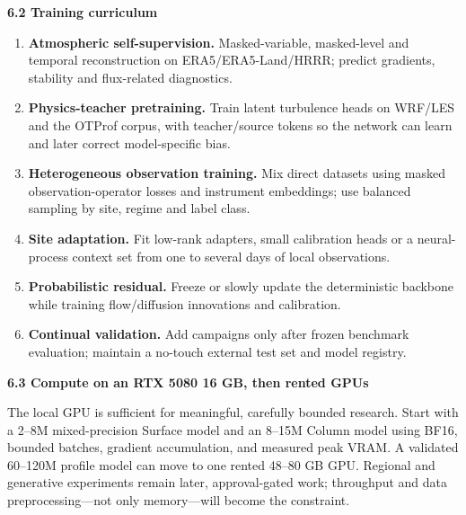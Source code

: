 \documentclass[
]{article}
\begin{document}
\textbf{6.2 Training curriculum}

\begin{enumerate}
\def\labelenumi{\arabic{enumi}.}
\item
  \textbf{Atmospheric self-supervision.} Masked-variable, masked-level
  and temporal reconstruction on ERA5/ERA5-Land/HRRR; predict gradients,
  stability and flux-related diagnostics.
\item
  \textbf{Physics-teacher pretraining.} Train latent turbulence heads on
  WRF/LES and the OTProf corpus, with teacher/source tokens so the
  network can learn and later correct model-specific bias.
\item
  \textbf{Heterogeneous observation training.} Mix direct datasets using
  masked observation-operator losses and instrument embeddings; use
  balanced sampling by site, regime and label class.
\item
  \textbf{Site adaptation.} Fit low-rank adapters, small calibration
  heads or a neural-process context set from one to several days of
  local observations.
\item
  \textbf{Probabilistic residual.} Freeze or slowly update the
  deterministic backbone while training flow/diffusion innovations and
  calibration.
\item
  \textbf{Continual validation.} Add campaigns only after frozen
  benchmark evaluation; maintain a no-touch external test set and model
  registry.
\end{enumerate}

\textbf{6.3 Compute on an RTX 5080 16 GB, then rented GPUs}

The local GPU is sufficient for meaningful, carefully bounded research.
Start with a 2--8M mixed-precision Surface model and an 8--15M Column
model using BF16, bounded batches, gradient accumulation, and measured
peak VRAM. A validated 60--120M profile model can move to one rented
48--80 GB GPU. Regional and generative experiments remain later,
approval-gated work; throughput and data preprocessing---not only
memory---will become the constraint.
\end{document}
